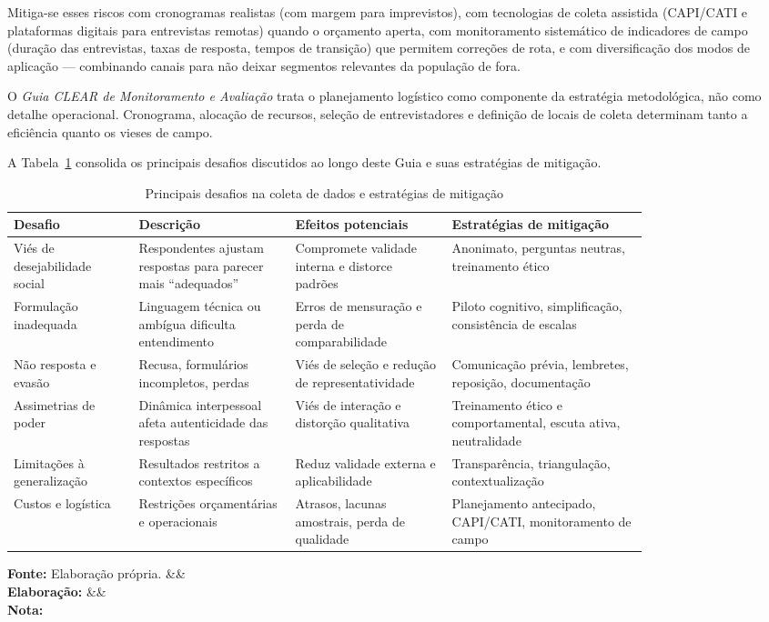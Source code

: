 \documentclass[12pt, a4paper, openany]{book}
\newcommand{\figmeta}[3]{%
  \par\vspace{4pt}%
  \begin{minipage}{\linewidth}%
  \footnotesize%
  \textbf{Fonte:} #1%
  \ifx&#2&\else\\\textbf{Elabora\c{c}\~ao:} #2\fi%
  \ifx&#3&\else\\\textbf{Nota:} #3\fi%
  \end{minipage}%
  \vspace{6pt}%
}
\begin{document}
Mitiga-se esses riscos com cronogramas realistas (com margem para imprevistos), com tecnologias de coleta assistida (CAPI/CATI e plataformas digitais para entrevistas remotas) quando o or\c{c}amento aperta, com monitoramento sistem\'atico de indicadores de campo (dura\c{c}\~ao das entrevistas, taxas de resposta, tempos de transi\c{c}\~ao) que permitem corre\c{c}\~oes de rota, e com diversifica\c{c}\~ao dos modos de aplica\c{c}\~ao --- combinando canais para n\~ao deixar segmentos relevantes da popula\c{c}\~ao de fora.

O \textit{Guia CLEAR de Monitoramento e Avalia\c{c}\~ao} \citep{fgvclear2025mea} trata o planejamento log\'istico como componente da estrat\'egia metodol\'ogica, n\~ao como detalhe operacional. Cronograma, aloca\c{c}\~ao de recursos, sele\c{c}\~ao de entrevistadores e defini\c{c}\~ao de locais de coleta determinam tanto a efici\^encia quanto os vieses de campo.

A Tabela~\ref{tab:desafios_mitigacao} consolida os principais desafios discutidos ao longo deste Guia e suas estrat\'egias de mitiga\c{c}\~ao.

\begin{table}[H]
\centering
\caption{Principais desafios na coleta de dados e estrat\'egias de mitiga\c{c}\~ao}
\label{tab:desafios_mitigacao}
\small
\begin{tabular}{p{0.16\linewidth} p{0.20\linewidth} p{0.20\linewidth} p{0.25\linewidth}}
\toprule
\textbf{Desafio} & \textbf{Descri\c{c}\~ao} & \textbf{Efeitos potenciais} & \textbf{Estrat\'egias de mitiga\c{c}\~ao} \\
\midrule
Vi\'es de desejabilidade social & Respondentes ajustam respostas para parecer mais ``adequados'' & Compromete validade interna e distorce padr\~oes & Anonimato, perguntas neutras, treinamento \'etico \\
Formula\c{c}\~ao inadequada & Linguagem t\'ecnica ou amb\'igua dificulta entendimento & Erros de mensura\c{c}\~ao e perda de comparabilidade & Piloto cognitivo, simplifica\c{c}\~ao, consist\^encia de escalas \\
N\~ao resposta e evas\~ao & Recusa, formul\'arios incompletos, perdas & Vi\'es de sele\c{c}\~ao e redu\c{c}\~ao de representatividade & Comunica\c{c}\~ao pr\'evia, lembretes, reposi\c{c}\~ao, documenta\c{c}\~ao \\
Assimetrias de poder & Din\^amica interpessoal afeta autenticidade das respostas & Vi\'es de intera\c{c}\~ao e distor\c{c}\~ao qualitativa & Treinamento \'etico e comportamental, escuta ativa, neutralidade \\
Limita\c{c}\~oes \`a generaliza\c{c}\~ao & Resultados restritos a contextos espec\'ificos & Reduz validade externa e aplicabilidade & Transpar\^encia, triangula\c{c}\~ao, contextualiza\c{c}\~ao \\
Custos e log\'istica & Restri\c{c}\~oes or\c{c}ament\'arias e operacionais & Atrasos, lacunas amostrais, perda de qualidade & Planejamento antecipado, CAPI/CATI, monitoramento de campo \\
\bottomrule
\end{tabular}
\figmeta{Elabora\c{c}\~ao pr\'opria.}{}{}
\end{table}
\end{document}
